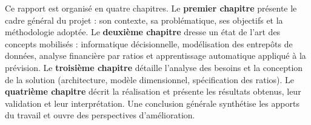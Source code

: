\medskip
Ce rapport est organisé en quatre chapitres. Le \textbf{premier chapitre} présente
le cadre général du projet : son contexte, sa problématique, ses objectifs et la
méthodologie adoptée. Le \textbf{deuxième chapitre} dresse un état de l'art des
concepts mobilisés : informatique décisionnelle, modélisation des entrepôts de
données, analyse financière par ratios et apprentissage automatique appliqué à la
prévision. Le \textbf{troisième chapitre} détaille l'analyse des besoins et la
conception de la solution (architecture, modèle dimensionnel, spécification des
ratios). Le \textbf{quatrième chapitre} décrit la réalisation et présente les
résultats obtenus, leur validation et leur interprétation. Une conclusion
générale synthétise les apports du travail et ouvre des perspectives
d'amélioration.
